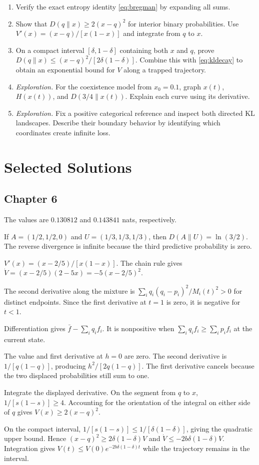 \documentclass[11pt,oneside,openany]{book}
\theoremstyle{definition}
\theoremstyle{remark}
\newenvironment{exercises}{\begin{enumerate}[label=\thechapter.\arabic*,ref=\thechapter.\arabic*,leftmargin=2.8em,itemsep=6pt]}{\end{enumerate}}
\newenvironment{answers}{\begin{description}[leftmargin=2.9em,labelwidth=2.5em,labelsep=.4em,itemsep=8pt,font=\normalfont\bfseries]}{\end{description}}
\numberwithin{equation}{chapter}
\begin{document}
\begin{exercises}
\item Verify the exact entropy identity \eqref{eq:bregman} by expanding all sums.
\item Show that $D(q\|x)\geq2(x-q)^2$ for interior binary probabilities. Use $V'(x)=(x-q)/[x(1-x)]$ and integrate from $q$ to $x$.
\item On a compact interval $[\delta,1-\delta]$ containing both $x$ and $q$, prove $D(q\|x)\leq(x-q)^2/[2\delta(1-\delta)]$. Combine this with \eqref{eq:kldecay} to obtain an exponential bound for $V$ along a trapped trajectory.
\item \emph{Exploration.} For the coexistence model from $x_0=0.1$, graph $x(t)$, $H(x(t))$, and $D(3/4\|x(t))$. Explain each curve using its derivative.
\item \emph{Exploration.} Fix a positive categorical reference and inspect both directed KL landscapes. Describe their boundary behavior by identifying which coordinates create infinite loss.
\end{exercises}

\clearpage\backmatter
\chapter*{Selected Solutions}
\section*{Chapter 6}
\begin{answers}
\item[6.1] The values are $0.130812$ and $0.143841$ nats, respectively.
\item[6.3] If $A=(1/2,1/2,0)$ and $U=(1/3,1/3,1/3)$, then $D(A\|U)=\ln(3/2)$. The reverse divergence is infinite because the third predictive probability is zero.
\item[6.5] $V'(x)=(x-2/5)/[x(1-x)]$. The chain rule gives $\dot V=(x-2/5)(2-5x)=-5(x-2/5)^2$.
\item[6.7] The second derivative along the mixture is $\sum_iq_i(q_i-p_i)^2/M_i(t)^2>0$ for distinct endpoints. Since the first derivative at $t=1$ is zero, it is negative for $t<1$.
\item[6.9] Differentiation gives $\bar f-\sum_iq_if_i$. It is nonpositive when $\sum_iq_if_i\geq\sum_ip_if_i$ at the current state.
\item[6.11] The value and first derivative at $h=0$ are zero. The second derivative is $1/[q(1-q)]$, producing $h^2/[2q(1-q)]$. The first derivative cancels because the two displaced probabilities still sum to one.
\item[6.15] Integrate the displayed derivative. On the segment from $q$ to $x$, $1/[s(1-s)]\geq4$. Accounting for the orientation of the integral on either side of $q$ gives $V(x)\geq2(x-q)^2$.
\item[6.16] On the compact interval, $1/[s(1-s)]\leq1/[\delta(1-\delta)]$, giving the quadratic upper bound. Hence $(x-q)^2\geq2\delta(1-\delta)V$ and $\dot V\leq-2b\delta(1-\delta)V$. Integration gives $V(t)\leq V(0)e^{-2b\delta(1-\delta)t}$ while the trajectory remains in the interval.
\end{answers}
\end{document}
